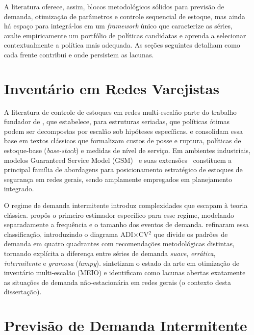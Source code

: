A literatura oferece, assim, blocos metodológicos sólidos para previsão de demanda, otimização de parâmetros e controle sequencial de estoque, mas ainda há espaço para integrá-los em um \textit{framework} único que caracterize as séries, avalie empiricamente um portfólio de políticas candidatas e aprenda a selecionar contextualmente a política mais adequada. As seções seguintes detalham como cada frente contribui e onde persistem as lacunas.

\section{Inventário em Redes Varejistas}

A literatura de controle de estoques em redes multi-escalão parte do trabalho fundador de \citet{ClarkScarf1960MultiEchelon}, que estabelece, para estruturas seriadas, que políticas ótimas podem ser decompostas por escalão sob hipóteses específicas. \citet{Axsater2006InventoryControl} e \citet{Zipkin2000FoundationsInventory} consolidam essa base em textos clássicos que formalizam custos de posse e ruptura, políticas de estoque-base (\textit{base-stock}) e medidas de nível de serviço. Em ambientes industriais, modelos Guaranteed Service Model (GSM)~\citep{GravesWillems2000SafetyStock} e suas extensões~\citep{Achkar2024GSMExtensions,Eruguz2016GSMsurvey} constituem a principal família de abordagens para posicionamento estratégico de estoques de segurança em redes gerais, sendo amplamente empregados em planejamento integrado.

O regime de demanda intermitente introduz complexidades que escapam à teoria clássica. \citet{Croston1972ForecastingIntermittentDemand} propôs o primeiro estimador específico para esse regime, modelando separadamente a frequência e o tamanho dos eventos de demanda. \citet{Syntetos2001IntermittentDemand} refinaram essa classificação, introduzindo o diagrama ADI$\times$CV$^2$ que divide os padrões de demanda em quatro quadrantes com recomendações metodológicas distintas, tornando explícita a diferença entre séries de demanda \textit{suave}, \textit{errática}, \textit{intermitente} e \textit{grumosa} (\textit{lumpy}). \citet{DeKok2018Typology} sintetizam o estado da arte em otimização de inventário multi-escalão (MEIO) e identificam como lacunas abertas exatamente as situações de demanda não-estacionária em redes gerais (o contexto desta dissertação).

\section{Previsão de Demanda Intermitente}

